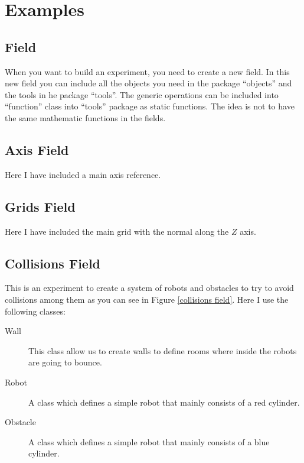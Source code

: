\documentclass[12pt,a4paper,oneside,english]{book}
\begin{document}
\chapter{Examples}

\section{Field}

When you want to build an experiment, you need to create a new field. In this new field you can include all the objects you need in the package ``objects'' and the tools in he package ``tools''. The generic operations can be included into ``function'' class into ``tools'' package as static functions. The idea is not to have the same mathematic functions in the fields.

\section{Axis Field}

Here I have included a main axis reference.

\section{Grids Field}

Here I have included the main grid with the normal along the $Z$ axis.

\section{Collisions Field}

This is an experiment to create a system of robots and obstacles to try to avoid collisions among them as you can see in Figure \ref{collisions field}. Here I use the following classes:

\begin{description}
  \item[Wall ] This class allow us to create walls to define rooms where inside the robots are going to bounce.
  \item[Robot ] A class which defines a simple robot that mainly consists of a red cylinder.
  \item[Obstacle ] A class which defines a simple robot that mainly consists of a blue cylinder.
\end{description}
\end{document}
